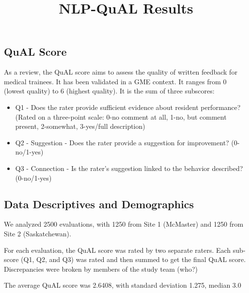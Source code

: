 \documentclass[
  letterpaper,
  DIV=11,
  numbers=noendperiod]{scrartcl}
\title{NLP-QuAL Results}
\author{}
\date{}
\providecommand{\tightlist}{%
  \setlength{\itemsep}{0pt}\setlength{\parskip}{0pt}}\usepackage{longtable,booktabs,array}
\renewcommand*\contentsname{Table of contents}
\newcommand\contentsname{Table of contents}
\begin{document}
\maketitle
\ifdefined\Shaded\renewenvironment{Shaded}{\begin{tcolorbox}[borderline west={3pt}{0pt}{shadecolor}, enhanced, interior hidden, sharp corners, breakable, frame hidden, boxrule=0pt]}{\end{tcolorbox}}\fi

\renewcommand*\contentsname{Table of contents}
{
\hypersetup{linkcolor=}
\setcounter{tocdepth}{3}
\tableofcontents
}
\hypertarget{qual-score}{%
\subsection{QuAL Score}\label{qual-score}}

As a review, the QuAL score aims to assess the quality of written
feedback for medical trainees. It has been validated in a GME context.
It ranges from 0 (lowest quality) to 6 (highest quality). It is the sum
of three subscores:

\begin{itemize}
\tightlist
\item
  Q1 - Does the rater provide sufficient evidence about resident
  performance? (Rated on a three-point scale: 0-no comment at all, 1-no,
  but comment present, 2-somewhat, 3-yes/full description)
\item
  Q2 - Suggestion - Does the rater provide a suggestion for improvement?
  (0-no/1-yes)
\item
  Q3 - Connection - Is the rater's suggestion linked to the behavior
  described? (0-no/1-yes)
\end{itemize}

\hypertarget{data-descriptives-and-demographics}{%
\subsection{Data Descriptives and
Demographics}\label{data-descriptives-and-demographics}}

We analyzed 2500 evaluations, with 1250 from Site 1 (McMaster) and 1250
from Site 2 (Saskatchewan).

For each evaluation, the QuAL score was rated by two separate raters.
Each sub-score (Q1, Q2, and Q3) was rated and then summed to get the
final QuAL score. Discrepancies were broken by members of the study team
(who?)

The average QuAL score was 2.6408, with standard deviation 1.275, median
3.0
\end{document}
